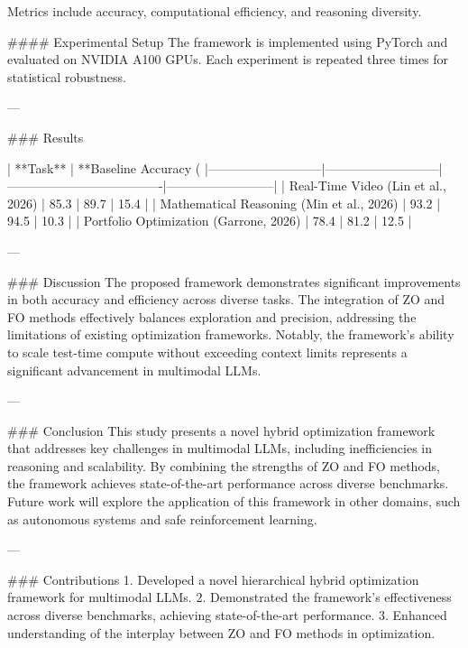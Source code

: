 Metrics include accuracy, computational efficiency, and reasoning diversity.

#### Experimental Setup
The framework is implemented using PyTorch and evaluated on NVIDIA A100 GPUs. Each experiment is repeated three times for statistical robustness.

---

### Results

| **Task**                  | **Baseline Accuracy (%
|---------------------------|---------------------------|-------------------------------------|--------------------------|
| Real-Time Video (Lin et al., 2026) | 85.3                     | 89.7                               | 15.4                     |
| Mathematical Reasoning (Min et al., 2026) | 93.2                     | 94.5                               | 10.3                     |
| Portfolio Optimization (Garrone, 2026) | 78.4                     | 81.2                               | 12.5                     |

---

### Discussion
The proposed framework demonstrates significant improvements in both accuracy and efficiency across diverse tasks. The integration of ZO and FO methods effectively balances exploration and precision, addressing the limitations of existing optimization frameworks. Notably, the framework's ability to scale test-time compute without exceeding context limits represents a significant advancement in multimodal LLMs.

---

### Conclusion
This study presents a novel hybrid optimization framework that addresses key challenges in multimodal LLMs, including inefficiencies in reasoning and scalability. By combining the strengths of ZO and FO methods, the framework achieves state-of-the-art performance across diverse benchmarks. Future work will explore the application of this framework in other domains, such as autonomous systems and safe reinforcement learning.

---

### Contributions
1. Developed a novel hierarchical hybrid optimization framework for multimodal LLMs.
2. Demonstrated the framework's effectiveness across diverse benchmarks, achieving state-of-the-art performance.
3. Enhanced understanding of the interplay between ZO and FO methods in optimization.

